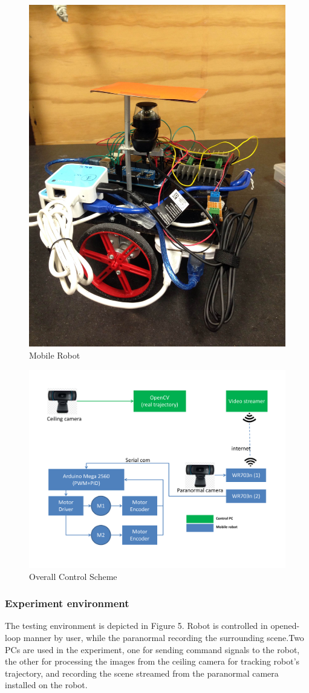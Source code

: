 \documentclass[letterpaper, 10 pt, conference]{ieeeconf}
\begin{document}
\begin{figure}
\centering
\includegraphics[width=.7\columnwidth]{mobileRobot.jpg}
\caption{Mobile Robot}
\end{figure}

\begin{figure}
\centering
\includegraphics[width=.7\columnwidth]{ControlFlow.pdf}
\caption{Overall Control Scheme}
\end{figure}

\subsubsection{Experiment environment}
The testing environment is depicted in Figure 5. Robot is controlled in opened-loop manner by user, while the paranormal recording the surrounding scene.Two PCs are used in the experiment, one for sending command signals to the robot, the other for processing the images from the ceiling camera for tracking robot's trajectory, and recording the scene streamed from the paranormal camera installed on the robot. 
\end{document}
